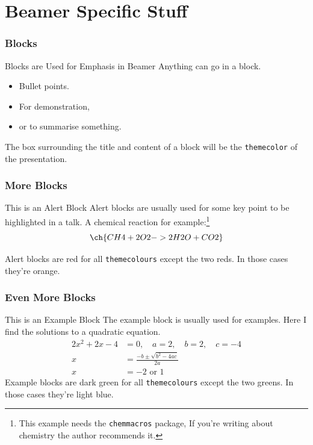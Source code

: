 \documentclass[aspectratio=169]{beamer}
\begin{document}
\section{Beamer Specific Stuff}


\begin{frame}
\frametitle{Blocks}
   \begin{block}{Blocks are Used for Emphasis in Beamer}
      Anything can go in a block.
      \begin{itemize}
         \item Bullet points.
         \item For demonstration,
         \item or to summarise something.
      \end{itemize}
   The box surrounding the title and content of a block will be the \texttt{themecolor} of the presentation.
   \end{block}
\end{frame}


\begin{frame}
\frametitle{More Blocks}
   \begin{alertblock}{This is an Alert Block}
      Alert blocks are usually used for some key point to be highlighted in a talk.
      A chemical reaction for example:\footnote{This example needs the \texttt{chemmacros} package, If you're writing about chemistry the author recommends it.}
      \begin{equation}
         \ch{CH4 + 2 O2 -> 2 H2O + CO2}
      \end{equation}
      
      Alert blocks are red for all \texttt{themecolours} except the two reds. In those cases they're orange.
   \end{alertblock}
\end{frame}


\begin{frame}
\frametitle{Even More Blocks}
   \begin{exampleblock}{This is an Example Block}
      The example block is usually used for examples. Here I find the solutions to a quadratic equation.
      \begin{align*}
         2x^2 + 2x - 4 & = 0, \quad a=2, \quad b =2, \quad c=-4\\
         x & =\frac{-b\pm\sqrt{b^2-4ac}}{2a} \\
         x & =-2 \text{ or } 1
      \end{align*}
      Example blocks are dark green for all \texttt{themecolours} except the two greens. In those cases they're light blue.
   \end{exampleblock}
\end{frame}
\end{document}

